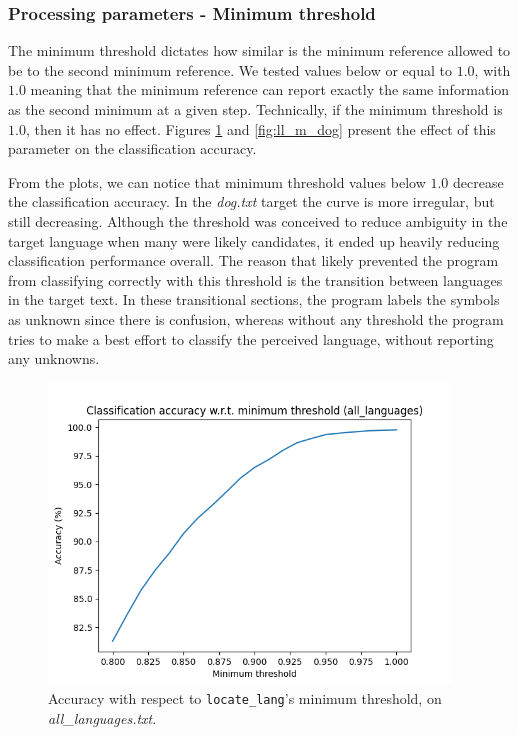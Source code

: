 \documentclass{article}
\begin{document}
\subsubsection{Processing parameters - Minimum threshold}
\label{subsubsec:results_locate_lang_minimum_threshold}

The minimum threshold dictates how similar is the minimum reference allowed to be to the second minimum reference.
We tested values below or equal to $1.0$, with $1.0$ meaning that the minimum reference can report exactly the same information as the second minimum at a given step.
Technically, if the minimum threshold is $1.0$, then it has no effect.
Figures \ref{fig:ll_m_all_languages} and \ref{fig:ll_m_dog} present the effect of this parameter on the classification accuracy.

From the plots, we can notice that minimum threshold values below $1.0$ decrease the classification accuracy.
In the \textit{dog.txt} target the curve is more irregular, but still decreasing.
Although the threshold was conceived to reduce ambiguity in the target language when many were likely candidates, it ended up heavily reducing classification performance overall.
The reason that likely prevented the program from classifying correctly with this threshold is the transition between languages in the target text.
In these transitional sections, the program labels the symbols as unknown since there is confusion, whereas without any threshold the program tries to make a best effort to classify the perceived language, without reporting any unknowns.

\begin{figure}
    \centering
    \includegraphics[width=0.95\textwidth]{../results/all_languages/ll-m.png}
    \caption{Accuracy with respect to \texttt{locate\_lang}'s minimum threshold, on \textit{all\_languages.txt}.}
    \label{fig:ll_m_all_languages}
\end{figure}
\end{document}
